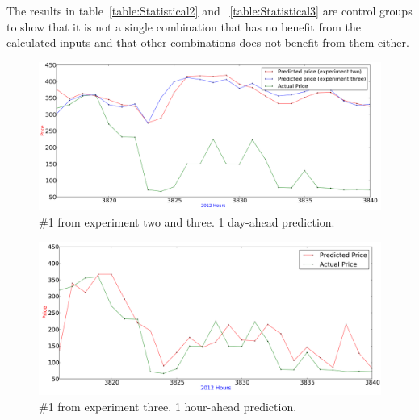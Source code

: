 The results in table~\ref{table:Statistical2} and ~\ref{table:Statistical3} are control groups to show that it is not a single combination that has no benefit from the calculated inputs and that other combinations does not benefit from them either.

\begin{figure}[H]
\centering
\includegraphics[width=\linewidth]{billeder/PriceExperimentalAnalysis/X2_X3_3816_3840.png}
\caption{\#1 from experiment two and three. 1 day-ahead prediction.}
\label{fig:X2_X3_3816_3840}
\end{figure}

\begin{figure}[H]
\centering
\includegraphics[width=\linewidth]{billeder/PriceExperimentalAnalysis/X2_X3_3816_3840_1hourAhead.png}
\caption{\#1 from experiment three. 1 hour-ahead prediction.}
\label{fig:X2_X3_3816_3840_1hourahead}
\end{figure}


